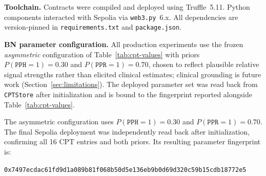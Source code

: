 \documentclass[journal]{IEEEtran}
\theoremstyle{definition}
\theoremstyle{remark}
\begin{document}
\textbf{Toolchain.}
Contracts were compiled and deployed using
Truffle~5.11. Python components interacted with Sepolia
via \texttt{web3.py}~6.x. All dependencies are
version-pinned in \texttt{requirements.txt} and
\texttt{package.json}.

\noindent\textbf{BN parameter configuration.}
All production experiments use the frozen \emph{asymmetric}
configuration of Table~\ref{tab:cpt-values} with priors
$P(\texttt{PPH}{=}1)=0.30$ and $P(\texttt{PPR}{=}1)=0.70$,
chosen to reflect plausible relative signal strengths
rather than elicited clinical estimates; clinical grounding
is future work (Section~\ref{sec:limitations}). The
deployed parameter set was read back from
\texttt{CPTStore} after initialization and is bound to the
fingerprint reported alongside Table~\ref{tab:cpt-values}.

\begin{table}[t]
\centering
\caption{Asymmetric CPT configuration used in non-neutral experiments.
Values are $P(E_i=1\mid\texttt{PPH}=i,\texttt{PPR}=j)$.
Parameters are set to reflect plausible signal strength for each
evidence source in physician-visit verification; clinical validation
against real visit data is identified as future work.}
\label{tab:cpt-values}
\end{table}

The asymmetric configuration uses
$P(\texttt{PPH}{=}1)=0.30$ and
$P(\texttt{PPR}{=}1)=0.70$.
The final Sepolia deployment was independently read back
after initialization, confirming all 16 CPT entries and
both priors. Its resulting parameter fingerprint is:
\begin{center}
{\tiny\texttt{0x7497ecdac61fd9d1a089b81f068b50d5e136eb9b0d69d320\-c59b15cdb18772e5}}
\end{center}
\end{document}
